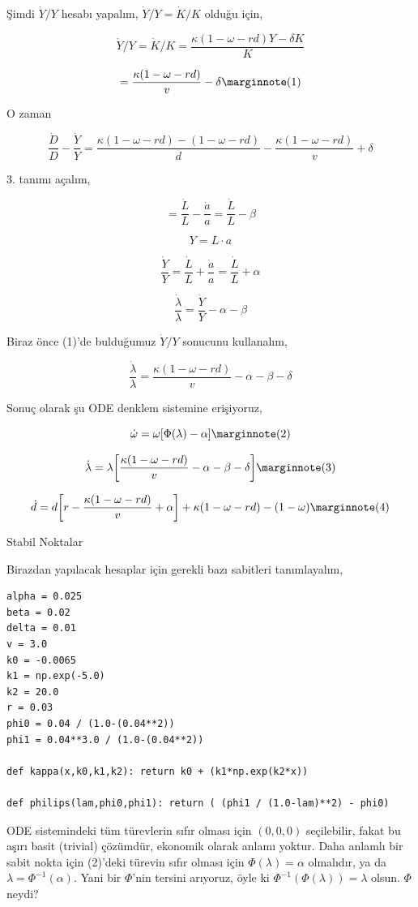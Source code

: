 \documentclass[12pt,fleqn]{article}\usepackage{../../common}
\begin{document}
Şimdi $\dot{Y}/Y$ hesabı yapalım, $\dot{Y}/Y = \dot{K}/K$ olduğu için,

$$ 
\dot{Y}/Y = \dot{K}/K = \frac{\kappa(1 - \omega - rd) Y - \delta K}{K}
$$

$$ 
 = \frac{\kappa(1 - \omega - rd) }{v}- \delta 
\mlabel{1}
$$

O zaman 

$$  
\frac{\dot{D}}{D} - \frac{\dot{Y}}{Y} =
\frac{ \kappa(1 - \omega - rd) - (1-\omega-rd) }{d} 
- \frac{\kappa(1 - \omega - rd) }{v} + \delta
$$

3. tanımı açalım,

$$  =  \frac{\dot{L}}{L} - \frac{\dot{a}}{a} = \frac{\dot{L}}{L} - \beta $$

$$ Y = L \cdot a $$

$$ 
\frac{\dot{Y}}{Y} = \frac{\dot{L}}{L} + \frac{\dot{a}}{a}
= \frac{\dot{L}}{L} + \alpha
$$

$$ \frac{\dot{\lambda}}{\lambda} = \frac{\dot{Y}}{Y} - \alpha - \beta $$

Biraz önce (1)'de bulduğumuz $\dot{Y}/Y$ sonucunu kullanalım,

$$ 
\frac{\dot{\lambda}}{\lambda} = 
\frac{\kappa(1-\omega-rd)}{v} - \alpha - \beta - \delta
$$

Sonuç olarak şu ODE denklem sistemine erişiyoruz, 

$$ 
\dot{\omega} = \omega [ \Phi(\lambda)-\alpha ] 
\mlabel{2}
$$ 

$$ 
\dot{\lambda}=  \lambda \bigg[ 
\frac{\kappa(1-\omega-rd)}{v} - \alpha - \beta - \delta
\bigg]
\mlabel{3}
$$

$$ 
\dot{d} = d \bigg[
r - \frac{\kappa(1-\omega-rd)}{v} + \alpha 
\bigg] + \kappa(1-\omega-rd) - (1-\omega)
\mlabel{4}
$$

Stabil Noktalar

Birazdan yapılacak hesaplar için gerekli bazı sabitleri tanımlayalım,

\begin{verbatim}
alpha = 0.025
beta = 0.02
delta = 0.01
v = 3.0
k0 = -0.0065
k1 = np.exp(-5.0)
k2 = 20.0
r = 0.03
phi0 = 0.04 / (1.0-(0.04**2))
phi1 = 0.04**3.0 / (1.0-(0.04**2))

def kappa(x,k0,k1,k2): return k0 + (k1*np.exp(k2*x))

def philips(lam,phi0,phi1): return ( (phi1 / (1.0-lam)**2) - phi0)
\end{verbatim}

ODE sistemindeki tüm türevlerin sıfır olması için $(0,0,0)$ seçilebilir,
fakat bu aşırı basit (trivial) çözümdür, ekonomik olarak anlamı
yoktur. Daha anlamlı bir sabit nokta için (2)'deki türevin sıfır olması
için $\Phi(\lambda)=\alpha $ olmalıdır, ya da
$\lambda=\Phi^{-1}(\alpha)$. Yani bir $\Phi$'nin tersini arıyoruz, öyle ki
$\Phi^{-1}(\Phi(\lambda)) = \lambda$ olsun. $\Phi$ neydi?
\end{document}
